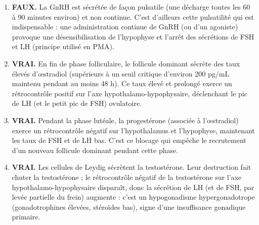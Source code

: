 \documentclass[11pt]{article}
\newcommand{\cle}[1]{{\popxbold\color{popdark}#1}}
\begin{document}
\begin{corrige}
\begin{enumerate}
    \item \textbf{FAUX.} La GnRH est sécrétée de façon \cle{pulsatile} (une décharge toutes les 60 à 90 minutes environ) et non continue. C'est d'ailleurs cette pulsatilité qui est indispensable : une administration continue de GnRH (ou d'un agoniste) provoque une désensibilisation de l'hypophyse et l'arrêt des sécrétions de FSH et LH (principe utilisé en PMA).
    \item \textbf{VRAI.} En fin de phase folliculaire, le follicule dominant sécrète des taux élevés d'œstradiol (supérieurs à un seuil critique d'environ 200 pg/mL maintenu pendant au moins 48 h). Ce taux élevé et prolongé exerce un \cle{rétrocontrôle positif} sur l'axe hypothalamo-hypophysaire, déclenchant le pic de LH (et le petit pic de FSH) ovulatoire.
    \item \textbf{VRAI.} Pendant la phase lutéale, la progestérone (associée à l'œstradiol) exerce un \cle{rétrocontrôle négatif} sur l'hypothalamus et l'hypophyse, maintenant les taux de FSH et de LH bas. C'est ce blocage qui empêche le recrutement d'un nouveau follicule dominant pendant cette phase.
    \item \textbf{VRAI.} Les cellules de Leydig sécrètent la testostérone. Leur destruction fait chuter la testostérone ; le rétrocontrôle négatif de la testostérone sur l'axe hypothalamo-hypophysaire disparaît, donc la sécrétion de LH (et de FSH, par levée partielle du frein) augmente : c'est un \cle{hypogonadisme hypergonadotrope} (gonadotrophines élevées, stéroïdes bas), signe d'une insuffisance gonadique primaire.
\end{enumerate}
\end{corrige}
\end{document}

